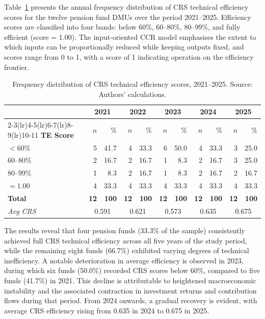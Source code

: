 \documentclass[12pt,a4paper]{article}
\begin{document}
Table~\ref{tab:crs_frequency} presents the annual frequency distribution of CRS technical efficiency scores for the twelve pension fund DMUs over the period 2021--2025. Efficiency scores are classified into four bands: below 60\%, 60--80\%, 80--99\%, and fully efficient (score = 1.00). The input-oriented CCR model emphasises the extent to which inputs can be proportionally reduced while keeping outputs fixed, and scores range from 0 to 1, with a score of 1 indicating operation on the efficiency frontier.

\begin{table}[H]
\centering
\caption{Frequency distribution of CRS technical efficiency scores, 2021--2025. Source: Authors' calculations.}
\label{tab:crs_frequency}
\begin{tabular}{lrrrrrrrrrr}
\toprule
 & \multicolumn{2}{c}{\textbf{2021}} & \multicolumn{2}{c}{\textbf{2022}} & \multicolumn{2}{c}{\textbf{2023}} & \multicolumn{2}{c}{\textbf{2024}} & \multicolumn{2}{c}{\textbf{2025}} \\
\cmidrule(lr){2-3}\cmidrule(lr){4-5}\cmidrule(lr){6-7}\cmidrule(lr){8-9}\cmidrule(lr){10-11}
\textbf{TE Score} & $n$ & \% & $n$ & \% & $n$ & \% & $n$ & \% & $n$ & \% \\
\midrule
$< 60\%$      & 5 & 41.7 & 4 & 33.3 & 6 & 50.0 & 4 & 33.3 & 3 & 25.0 \\
$60$--$80\%$  & 2 & 16.7 & 2 & 16.7 & 1 &  8.3 & 2 & 16.7 & 3 & 25.0 \\
$80$--$99\%$  & 1 &  8.3 & 2 & 16.7 & 1 &  8.3 & 2 & 16.7 & 2 & 16.7 \\
$= 1.00$      & 4 & 33.3 & 4 & 33.3 & 4 & 33.3 & 4 & 33.3 & 4 & 33.3 \\
\midrule
\textbf{Total}    & \textbf{12} & \textbf{100} & \textbf{12} & \textbf{100} & \textbf{12} & \textbf{100} & \textbf{12} & \textbf{100} & \textbf{12} & \textbf{100} \\
\textit{Avg CRS}  & \multicolumn{2}{c}{0.591} & \multicolumn{2}{c}{0.621} & \multicolumn{2}{c}{0.573} & \multicolumn{2}{c}{0.635} & \multicolumn{2}{c}{0.675} \\
\bottomrule
\end{tabular}
\end{table}

The results reveal that four pension funds (33.3\% of the sample) consistently achieved full CRS technical efficiency across all five years of the study period, while the remaining eight funds (66.7\%) exhibited varying degrees of technical inefficiency. A notable deterioration in average efficiency is observed in 2023, during which six funds (50.0\%) recorded CRS scores below 60\%, compared to five funds (41.7\%) in 2021. This decline is attributable to heightened macroeconomic instability and the associated contraction in investment returns and contribution flows during that period. From 2024 onwards, a gradual recovery is evident, with average CRS efficiency rising from 0.635 in 2024 to 0.675 in 2025.
\end{document}
